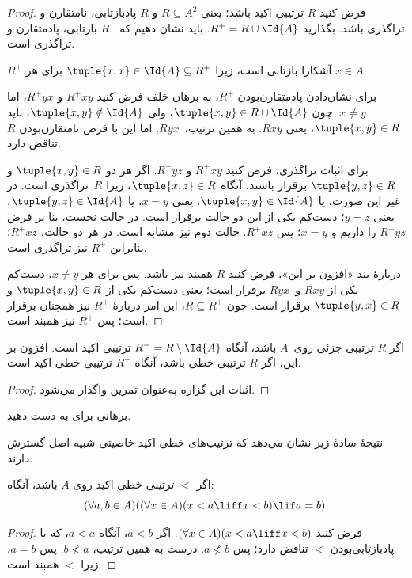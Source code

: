 \documentclass[../../../include/open-logic-section]{subfiles}
\begin{document}
\begin{proof}
فرض کنید $R$ ترتیبی اکید باشد؛ یعنی $R \subseteq A^2$ و $R$
پادبازتابی، نامتقارن و تراگذری باشد. بگذارید $R^+ = R \cup \Id{A}$.
باید نشان دهیم که $R^+$ بازتابی، پادمتقارن و تراگذری است.

$R^+$ آشکارا بازتابی است، زیرا $\tuple{x, x} \in \Id{A} \subseteq
R^+$ برای هر $x \in A$.

برای نشان‌دادن پادمتقارن‌بودن $R^+$، به برهان خلف فرض کنید $R^+xy$ و
$R^+yx$، اما $x \neq y$. چون $\tuple{x,y} \in R \cup \Id{A}$، ولی
$\tuple{x, y} \notin \Id{A}$، باید $\tuple{x, y} \in R$، یعنی
$Rxy$. به همین ترتیب،~$Ryx$. اما این با فرض نامتقارن‌بودن $R$ تناقض
دارد.

برای اثبات تراگذری، فرض کنید $R^+xy$ و $R^+yz$. اگر هر دو
$\tuple{x, y} \in R$ و $\tuple{y,z} \in R$ برقرار باشند، آنگاه $\tuple{x, z} \in
R$، زیرا $R$~تراگذری است. در غیر این صورت، یا $\tuple{x, y} \in
\Id{A}$، یعنی $x = y$، یا $\tuple{y, z} \in \Id{A}$، یعنی $y = z$؛
دست‌کم یکی از این دو حالت برقرار است.
در حالت نخست، بنا بر فرض $R^+yz$ را داریم و $x = y$؛ پس $R^+xz$. حالت
دوم نیز مشابه است. در هر دو حالت، $R^+xz$؛ بنابراین $R^+$ نیز تراگذری
است.

دربارهٔ بند «افزون بر این»، فرض کنید $R$ همبند نیز باشد. پس برای هر
$x \neq y$، دست‌کم یکی از $Rxy$ و~$Ryx$ برقرار است؛ یعنی دست‌کم یکی از
$\tuple{x, y} \in R$ و $\tuple{y, x} \in R$ برقرار است. چون $R \subseteq R^+$، این امر دربارهٔ $R^+$
نیز همچنان برقرار است؛ پس $R^+$ نیز همبند است.
\end{proof}

\begin{prop}
اگر $R$ ترتیبی جزئی روی~$A$ باشد، آنگاه $R^- = R \setminus \Id{A}$
ترتیبی اکید است. افزون بر این، اگر $R$ ترتیبی خطی باشد، آنگاه $R^-$
ترتیبی خطی اکید است.
\end{prop}

\begin{proof}
اثبات این گزاره به‌عنوان تمرین واگذار می‌شود.
\end{proof}

\begin{prob}
برهانی برای  به دست دهید.
\end{prob}

نتیجهٔ سادهٔ زیر نشان می‌دهد که ترتیب‌های خطی اکید خاصیتی شبیه اصل
گسترش دارند:

\begin{prop}
اگر $<$ ترتیبی خطی اکید روی $A$ باشد، آنگاه:
\[
  (\forall a, b \in A)((\forall x \in A)(x < a \liff x < b) \lif a = b).
\]
\end{prop}

\begin{proof}
فرض کنید $(\forall x \in A)(x < a \liff x < b)$. اگر $a < b$، آنگاه
$a <
a$، که با پادبازتابی‌بودن $<$ تناقض دارد؛ پس $a \nless b$. درست به
همین ترتیب، $b \nless a$. پس $a = b$، زیرا $<$ همبند است.
\end{proof}
\end{document}
